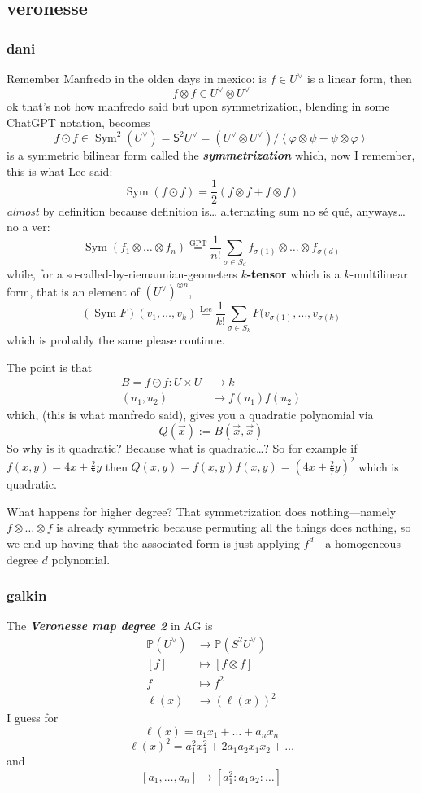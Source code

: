 \subsection{veronesse}
\subsubsection{dani}
Remember Manfredo in the olden days in mexico: is \(f \in U^\vee\) is a linear form, then
\[f \otimes f \in U^\vee \otimes U^\vee\]
ok that's not how manfredo said but upon symmetrization, blending in some ChatGPT notation, becomes
\[f \odot f\in \operatorname{Sym}^2(U^\vee)=\mathsf{S}^2U^\vee=(U^\vee\otimes U^\vee)/\left<\varphi \otimes \psi - \psi \otimes \varphi\right>\]
is a symmetric bilinear form called the \textit{\textbf{symmetrization}} which, now I remember, this is what Lee said:
\[\operatorname{Sym}(f  \odot f)=\frac{1}{2}(f\otimes f + f \otimes f)\]
\textit{almost} by definition because definition is… alternating sum no sé qué, anyways… no a ver:
\[\operatorname{Sym}(f_1 \otimes \ldots \otimes f_n)\overset{\text{GPT} }{=}\frac{1}{n!}\sum_{\sigma \in S_d}f_{\sigma(1)}\otimes \ldots \otimes f_{\sigma(d)}\]
while, for a so-called-by-riemannian-geometers \textbf{\(k\)-tensor} which is a  \(k\)-multilinear form, that is an element of \((U^{\vee})^{\otimes n}\),
\[(\operatorname{Sym}F)(v_1,\ldots,v_k)\overset{\text{Lee} }{=}\frac{1}{k!}\sum_{\sigma \in S_k}F(v_{\sigma(1)},\ldots,v_{\sigma(k)}\]
which is probably the same please continue.

The point is that
\begin{align*}
	B=f \odot f: U \times U &\longrightarrow k \\
	(u_1,u_2)&\longmapsto f(u_1)f(u_2)
\end{align*}
which, (this is what manfredo said), gives you a quadratic polynomial via
\[Q(\vec{x}):=B(\vec{x},\vec{x})\]
So why is it quadratic? Because what is quadratic…? So for example if \(f(x,y)=4x+\frac{2}{7}y\) then \(Q(x,y)=f(x,y)f(x,y)=(4x+\frac{2}{7}y)^2\) which is quadratic.

What happens for higher degree? That symmetrization does nothing---namely \(f \otimes \ldots \otimes f\) is already symmetric because permuting all the things does nothing, so we end up having that the associated form is just applying \(f^d\)---a homogeneous degree \(d\) polynomial.




\subsubsection{galkin}
The \textit{\textbf{Veronesse map degree 2}} in AG is 
\begin{align*}
	\mathbb{P}(U^\vee ) &\longrightarrow \mathbb{P}(S^2U^\vee) \\
	[f] &\longmapsto [f \otimes f]\\
	f & \longmapsto f^2\\
	\ell(x) & \longrightarrow (\ell(x))^2
\end{align*}
I guess for
\[\ell(x)=a_1x_1+\ldots+a_nx_n\]
\[\ell(x)^2=a_1^2x_1^2+2a_1a_2x_1x_2+\ldots\]
and
\[[a_1,\ldots,a_n]\to [a_1^2:a_1a_2:\ldots]\]

